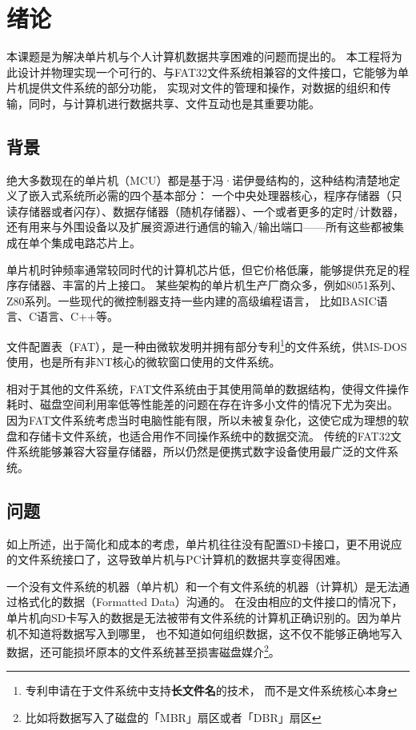 \chapter{绪论}
\label{chap:Introduction}
本课题是为解决单片机与个人计算机数据共享困难的问题而提出的。
本工程将为此设计并物理实现一个可行的、与FAT32文件系统相兼容的文件接口，它能够为单片机提供文件系统的部分功能，
实现对文件的管理和操作，对数据的组织和传输，同时，与计算机进行数据共享、文件互动也是其重要功能。
\section{背景}
\label{sec:Background}
绝大多数现在的单片机\supercite{mcu1,mcu2}（MCU）都是基于冯·诺伊曼结构的，这种结构清楚地定义了嵌入式系统所必需的四个基本部分：
一个中央处理器核心，程序存储器（只读存储器或者闪存）、数据存储器（随机存储器）、一个或者更多的定时/计数器，
还有用来与外围设备以及扩展资源进行通信的输入/输出端口——所有这些都被集成在单个集成电路芯片上。

单片机时钟频率通常较同时代的计算机芯片低，但它价格低廉，能够提供充足的程序存储器、丰富的片上接口。
某些架构的单片机生产厂商众多，例如8051系列\supercite{mcu3}、Z80系列。一些现代的微控制器支持一些内建的高级编程语言，
比如BASIC语言、C语言\supercite{mcu4}、C++等。

文件配置表（FAT），是一种由微软发明并拥有部分专利\footnote{专利申请在于文件系统中支持\textbf{长文件名\supercite{lfn1}}的技术，
而不是文件系统核心本身}的文件系统，供MS-DOS使用，也是所有非NT核心的微软窗口使用的文件系统。

相对于其他的文件系统，FAT文件系统\supercite{fatms}由于其使用简单的数据结构，使得文件操作耗时、磁盘空间利用率低等性能差的问题在存在许多小文件的情况下尤为突出\supercite{fat5}。
因为FAT文件系统考虑当时电脑性能有限，所以未被复杂化，这使它成为理想的软盘和存储卡文件系统，也适合用作不同操作系统中的数据交流。
传统的FAT32\supercite{fat4,fat8}文件系统能够兼容大容量存储器，所以仍然是便携式数字设备使用最广泛的文件系统\supercite{fatrv}。
\section{问题}
\label{sec:Issues}
如上所述，出于简化和成本的考虑，单片机往往没有配置SD卡\supercite{sdgp}接口，更不用说应的文件系统接口了，这导致单片机与PC计算机的数据共享变得困难。

一个没有文件系统的机器（单片机）和一个有文件系统的机器（计算机）是无法通过格式化的数据（Formatted Data）沟通的。
在没由相应的文件接口的情况下，单片机向SD卡写入的数据是无法被带有文件系统的计算机正确识别的。因为单片机不知道将数据写入到哪里，
也不知道如何组织数据，这不仅不能够正确地写入数据，还可能损坏原本的文件系统甚至损害磁盘媒介\footnote{比如将数据写入了磁盘的「MBR」扇区或者「DBR」扇区}。

